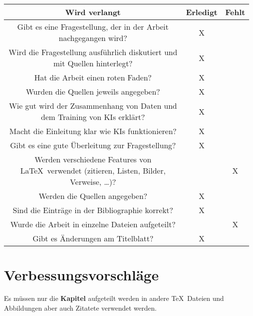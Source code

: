 \documentclass{article}
\begin{document}
\begin{table}[h]
    \centering
    \label{JustTable}
    \begin{tabular}{|c|c|c|}
    \hline
    Wird verlangt & Erledigt & Fehlt \\
    \hline
    Gibt es eine Fragestellung, der in der Arbeit nachgegangen wird? & X &  \\
    \hline
    Wird die Fragestellung ausführlich diskutiert und mit Quellen hinterlegt? & X &  \\
    \hline
    Hat die Arbeit einen roten Faden? & X &  \\
    \hline
    Wurden die Quellen jeweils angegeben? & X &  \\
    \hline
    Wie gut wird der Zusammenhang von Daten und dem Training von KIs erklärt? & X &  \\
    \hline
    Macht die Einleitung klar wie KIs funktionieren? & X &  \\
    \hline
    Gibt es eine gute Überleitung zur Fragestellung? & X &  \\
    \hline
    Werden verschiedene Features von \LaTeX\ verwendet (zitieren, Listen, Bilder, Verweise, …)? &  & X \\
    \hline
    Werden die Quellen angegeben? & X &  \\
    \hline
    Sind die Einträge in der Bibliographie korrekt? & X &  \\
    \hline
    Wurde die Arbeit in einzelne Dateien aufgeteilt? &  & X \\
    \hline
    Gibt es Änderungen am Titelblatt? & X &  \\
    \hline
    \end{tabular}
\end{table}


\section{Verbessungsvorschläge}

Es müssen nur die \textbf{Kapitel} aufgeteilt werden in andere \TeX\ Dateien und Abbildungen aber auch Zitatete verwendet werden.

\printbibliography
\end{document}
